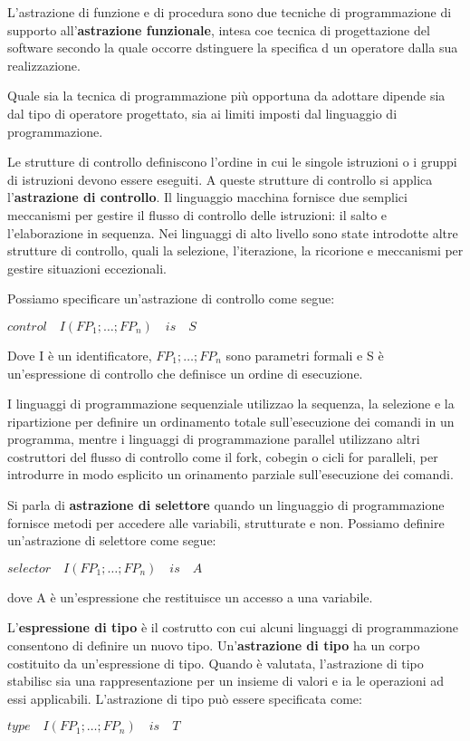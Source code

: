 \documentclass[a4paper,18pt]{extarticle}
\begin{document}
L'astrazione di funzione e di procedura sono due tecniche di programmazione di supporto all'\textbf{astrazione funzionale}, intesa coe tecnica di progettazione del software secondo la quale occorre dstinguere la specifica d un operatore dalla sua realizzazione.

Quale sia la tecnica di programmazione più opportuna da adottare dipende sia dal tipo di operatore progettato, sia ai limiti imposti dal linguaggio di programmazione.

Le strutture di controllo definiscono l'ordine in cui le singole istruzioni o i gruppi di istruzioni devono essere eseguiti. A queste strutture di controllo si applica l'\textbf{astrazione di controllo}. Il linguaggio macchina fornisce due semplici meccanismi per gestire il flusso di controllo delle istruzioni: il salto e l'elaborazione in sequenza. Nei linguaggi di alto livello sono state introdotte altre strutture di controllo, quali la selezione, l'iterazione, la ricorione e meccanismi per gestire situazioni eccezionali.

Possiamo specificare un'astrazione di controllo come segue:

\begin{center}
    $control \quad I(FP_1;\dots;FP_n) \quad is\quad S$
\end{center}

Dove I è un identificatore, $FP_1;\dots;FP_n$ sono parametri formali e S è un'espressione di controllo che definisce un ordine di esecuzione.

I linguaggi di programmazione sequenziale utilizzao la sequenza, la selezione e la ripartizione per definire un ordinamento totale sull'esecuzione dei comandi in un programma, mentre i linguaggi di programmazione parallel utilizzano altri costruttori del flusso di controllo come il fork, cobegin o cicli for paralleli, per introdurre in modo esplicito un orinamento parziale sull'esecuzione dei comandi.

Si parla di \textbf{astrazione di selettore} quando un linguaggio di programmazione fornisce metodi per accedere alle variabili, strutturate e non. Possiamo definire un'astrazione di selettore come segue:

\begin{center}
    $selector \quad I(FP_1;\dots;FP_n) \quad is\quad A$
\end{center}

dove A è un'espressione che restituisce un accesso a una variabile.

L'\textbf{espressione di tipo} è il costrutto con cui alcuni linguaggi di programmazione consentono di definire un nuovo tipo. Un'\textbf{astrazione di tipo} ha un corpo costituito da un'espressione di tipo. Quando è valutata, l'astrazione di tipo stabilisc sia una rappresentazione per un insieme di valori e ia le operazioni ad essi applicabili. L'astrazione di tipo può essere specificata come:
\begin{center}
    $type \quad I(FP_1;\dots;FP_n) \quad is\quad T$
\end{center}
\end{document}
